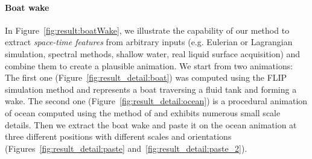 \paragraph{Boat wake}
In Figure~\ref{fig:result:boatWake}, we illustrate the capability of our method to extract \emph{space-time features} from arbitrary inputs (e.g. Eulerian or Lagrangian simulation, spectral methods, shallow water, real liquid surface acquisition) and combine them to create a plausible animation.
We start from two animations: 
The first one (Figure~\ref{fig:result_detail:boat}) 
was computed using the FLIP simulation method \cite{Zhu2005} and represents a boat traversing a fluid tank and forming a wake.
The second one (Figure~\ref{fig:result_detail:ocean}) is a procedural animation of ocean computed using the method of \cite{Tessendorf2004} and exhibits numerous small scale details.
Then we extract the boat wake and paste it on the ocean animation at three different positions with different scales and orientations (Figures~\ref{fig:result_detail:paste} and~\ref{fig:result_detail:paste_2}).

